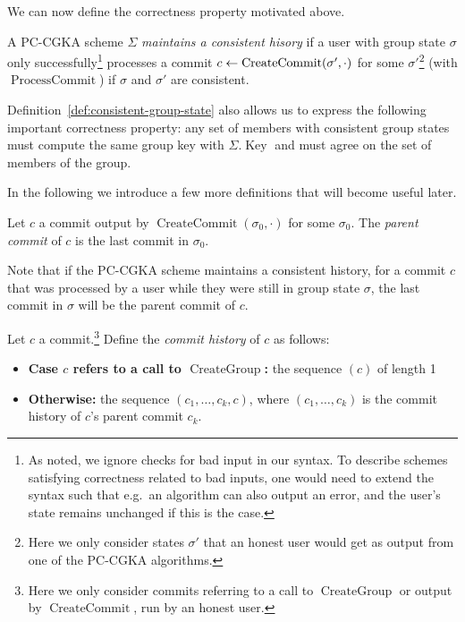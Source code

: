 We can now define the correctness property motivated above.

\begin{definition} \label{def:cgka-correctness-consistent-history}
	A PC-CGKA scheme $\Sigma$ \emph{maintains a consistent hisory} if a user with group state $\sigma$ only successfully\footnote{As noted, we ignore checks for bad input in our syntax. To describe schemes satisfying correctness related to bad inputs, one would need to extend the syntax such that e.g.\ an algorithm can also output an error, and the user's state remains unchanged if this is the case.} processes a commit $c \leftarrow \operatorname{CreateCommit}(\sigma', \cdot)$ for some $\sigma'$\footnote{Here we only consider states $\sigma'$ that an honest user would get as output from one of the PC-CGKA algorithms.} (with $\operatorname{ProcessCommit}$) if $\sigma$ and $\sigma'$ are consistent.
\end{definition}

Definition~\ref{def:consistent-group-state} also allows us to express the following important correctness property: any set of members with consistent group states must compute the same group key with $\Sigma.\operatorname{Key}$ and must agree on the set of members of the group.

In the following we introduce a few more definitions that will become useful later.

\begin{definition}
	Let $c$ a commit output by $\operatorname{CreateCommit}(\sigma_0, \cdot)$ for some $\sigma_0$. The \emph{parent commit} of $c$ is the last commit in $\sigma_0$.
\end{definition}

Note that if the PC-CGKA scheme maintains a consistent history, for a commit $c$ that was processed by a user while they were still in group state $\sigma$, the last commit in $\sigma$ will be the parent commit of $c$.

\begin{definition} \label{def:commit-history}
	Let $c$ a commit.\footnote{Here we only consider commits referring to a call to $\operatorname{CreateGroup}$ or output by $\operatorname{CreateCommit}$, run by an honest user.} Define the \emph{commit history} of $c$ as follows:
	\begin{itemize}
		\item \textbf{Case $c$ refers to a call to $\operatorname{CreateGroup}$:} the sequence $(c)$ of length 1
		\item \textbf{Otherwise:} the sequence $(c_1, \ldots, c_k, c)$, where $(c_1, \ldots, c_k)$ is the commit history of $c$'s parent commit $c_k$.
	\end{itemize}
\end{definition}

